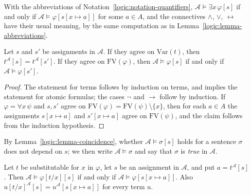 \begin{remark}\label{logic:remark-exists}
With the abbreviations of Notation~\ref{logic:notation-quantifiers},
$\mathcal{A} \models \exists x\,\varphi[s]$ if and only if
$\mathcal{A} \models \varphi[s[x \mapsto a]]$ for some $a \in A$, and the
connectives $\wedge$, $\vee$, $\leftrightarrow$ have their usual meaning, by
the same computation as in Lemma~\ref{logic:lemma-abbreviations}.
\end{remark}

\begin{lemma}\label{logic:lemma-coincidence}
Let $s$ and $s'$ be assignments in $\mathcal{A}$. If they agree on
$\mathrm{Var}(t)$, then $t^{\mathcal{A}}[s] = t^{\mathcal{A}}[s']$. If they
agree on $\mathrm{FV}(\varphi)$, then $\mathcal{A} \models \varphi[s]$ if and
only if $\mathcal{A} \models \varphi[s']$.
\end{lemma}

\begin{proof}
The statement for terms follows by induction on terms, and implies the
statement for atomic formulas; the cases $\neg$ and $\to$ follow by induction.
If $\varphi = \forall x\,\psi$ and $s, s'$ agree on
$\mathrm{FV}(\varphi) = \mathrm{FV}(\psi) \setminus \{x\}$, then for each
$a \in A$ the assignments $s[x \mapsto a]$ and $s'[x \mapsto a]$ agree on
$\mathrm{FV}(\psi)$, and the claim follows from the induction hypothesis.
\end{proof}

\begin{notation}\label{logic:notation-sentences}
By Lemma~\ref{logic:lemma-coincidence}, whether $\mathcal{A} \models \sigma[s]$
holds for a sentence $\sigma$ does not depend on $s$; we then write
$\mathcal{A} \models \sigma$ and say that $\sigma$ is \emph{true} in
$\mathcal{A}$.
\end{notation}

\begin{lemma}\label{logic:lemma-substitution}
Let $t$ be substitutable for $x$ in $\varphi$, let $s$ be an assignment in
$\mathcal{A}$, and put $a = t^{\mathcal{A}}[s]$. Then
$\mathcal{A} \models \varphi[t/x][s]$ if and only if
$\mathcal{A} \models \varphi[s[x \mapsto a]]$. Also
$u[t/x]^{\mathcal{A}}[s] = u^{\mathcal{A}}[s[x \mapsto a]]$ for every term $u$.
\end{lemma}

